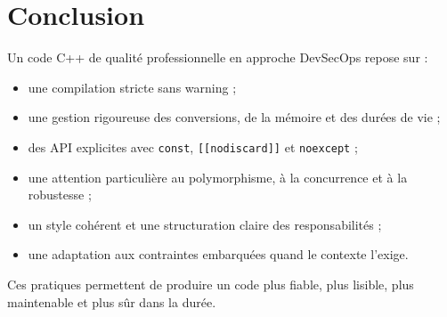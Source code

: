 \documentclass[a4paper,11pt]{report}
\begin{document}
\chapter{Conclusion}

Un code C++ de qualité professionnelle en approche DevSecOps repose sur :
\begin{itemize}
    \item une compilation stricte sans warning ;
    \item une gestion rigoureuse des conversions, de la mémoire et des durées de vie ;
    \item des API explicites avec \texttt{const}, \texttt{[[nodiscard]]} et \texttt{noexcept} ;
    \item une attention particulière au polymorphisme, à la concurrence et à la robustesse ;
    \item un style cohérent et une structuration claire des responsabilités ;
    \item une adaptation aux contraintes embarquées quand le contexte l'exige.
\end{itemize}

Ces pratiques permettent de produire un code plus fiable, plus lisible, plus maintenable et plus sûr dans la durée.
\end{document}
